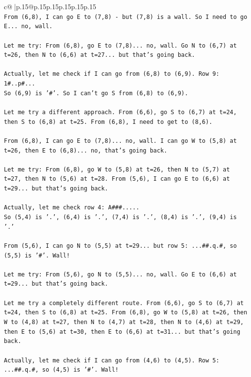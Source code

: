 \documentclass{article}
\begin{document}
{\begin{supertabular}{c@{$\;$}|p{.15\linewidth}@{}p{.15\linewidth}p{.15\linewidth}p{.15\linewidth}p{.15\linewidth}p{.15\linewidth}}
{{{\\ 
\texttt{From (6,8), I can go E to (7,8) {-} but (7,8) is a wall. So I need to go E... no, wall.} \\
\\ 
\texttt{Let me try: From (6,8), go E to (7,8)... no, wall. Go N to (6,7) at t=26, then N to (6,6) at t=27... but that's going back.} \\
\\ 
\texttt{Actually, let me check if I can go from (6,8) to (6,9). Row 9: 1\#..p\#...} \\
\texttt{So (6,9) is '\#'. So I can't go S from (6,8) to (6,9).} \\
\\ 
\texttt{Let me try a different approach. From (6,6), go S to (6,7) at t=24, then S to (6,8) at t=25. From (6,8), I need to get to (8,6).} \\
\\ 
\texttt{From (6,8), I can go E to (7,8)... no, wall. I can go W to (5,8) at t=26, then E to (6,8)... no, that's going back.} \\
\\ 
\texttt{Let me try: From (6,8), go W to (5,8) at t=26, then N to (5,7) at t=27, then N to (5,6) at t=28. From (5,6), I can go E to (6,6) at t=29... but that's going back.} \\
\\ 
\texttt{Actually, let me check row 4: A\#\#\#.....} \\
\texttt{So (5,4) is '.', (6,4) is '.', (7,4) is '.', (8,4) is '.', (9,4) is '.'} \\
\\ 
\texttt{From (5,6), I can go N to (5,5) at t=29... but row 5: ...\#\#.q.\#, so (5,5) is '\#'. Wall!} \\
\\ 
\texttt{Let me try: From (5,6), go N to (5,5)... no, wall. Go E to (6,6) at t=29... but that's going back.} \\
\\ 
\texttt{Let me try a completely different route. From (6,6), go S to (6,7) at t=24, then S to (6,8) at t=25. From (6,8), go W to (5,8) at t=26, then W to (4,8) at t=27, then N to (4,7) at t=28, then N to (4,6) at t=29, then E to (5,6) at t=30, then E to (6,6) at t=31... but that's going back.} \\
\\ 
\texttt{Actually, let me check if I can go from (4,6) to (4,5). Row 5: ...\#\#.q.\#, so (4,5) is '\#'. Wall!} \\
}}}
\end{supertabular}}
\end{document}
